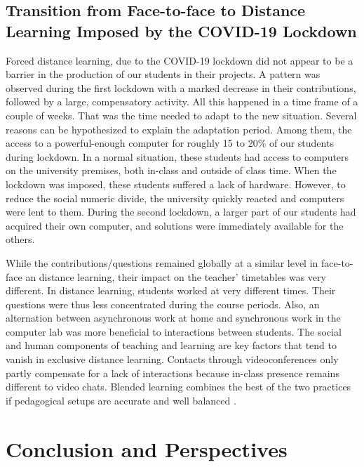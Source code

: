 \documentclass{aims} %
\theoremstyle{definition}
\begin{document}
\hypertarget{transition-from-face-to-face-to-distance-learning-imposed-by-the-covid-19-lockdown-2}{%
\subsection{Transition from Face-to-face to Distance Learning Imposed by
the COVID-19
Lockdown}\label{transition-from-face-to-face-to-distance-learning-imposed-by-the-covid-19-lockdown-2}}

Forced distance learning, due to the COVID-19 lockdown did not appear to
be a barrier in the production of our students in their projects. A
pattern was observed during the first lockdown with a marked decrease in
their contributions, followed by a large, compensatory activity. All
this happened in a time frame of a couple of weeks. That was the time
needed to adapt to the new situation. Several reasons can be
hypothesized to explain the adaptation period. Among them, the access to
a powerful-enough computer for roughly 15 to 20\% of our students during
lockdown. In a normal situation, these students had access to computers
on the university premises, both in-class and outside of class time.
When the lockdown was imposed, these students suffered a lack of
hardware. However, to reduce the social numeric divide, the university
quickly reacted and computers were lent to them. During the second
lockdown, a larger part of our students had acquired their own computer,
and solutions were immediately available for the others.

While the contributions/questions remained globally at a similar level
in face-to-face an distance learning, their impact on the teacher'
timetables was very different. In distance learning, students worked at
very different times. Their questions were thus less concentrated during
the course periods. Also, an alternation between asynchronous work at
home and synchronous work in the computer lab was more beneficial to
interactions between students. The social and human components of
teaching and learning are key factors that tend to vanish in exclusive
distance learning. Contacts through videoconferences only partly
compensate for a lack of interactions because in-class presence remains
different to video chats. Blended learning combines the best of the two
practices if pedagogical setups are accurate and well balanced
\cite{Bernard2014}.

\hypertarget{conclusion-and-perspectives}{%
\section{Conclusion and
Perspectives}\label{conclusion-and-perspectives}}
\end{document}
